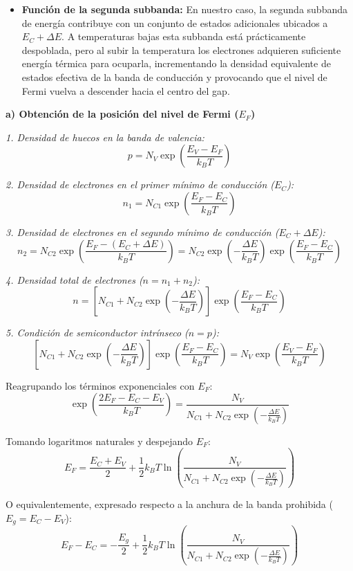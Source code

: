 \begin{problema}
\begin{itemize}
    \item \textbf{Función de la segunda subbanda:}
    En nuestro caso, la segunda subbanda de energía contribuye con un conjunto de estados adicionales ubicados a $E_C + \Delta E$. A temperaturas bajas esta subbanda está prácticamente despoblada, pero al subir la temperatura los electrones adquieren suficiente energía térmica para ocuparla, incrementando la densidad equivalente de estados efectiva de la banda de conducción y provocando que el nivel de Fermi vuelva a descender hacia el centro del gap.
\end{itemize}

\textbf{a) Obtención de la posición del nivel de Fermi ($E_F$)}

\textit{1. Densidad de huecos en la banda de valencia:}
\[
p = N_V \exp\left( \frac{E_V - E_F}{k_B T} \right)
\]

\textit{2. Densidad de electrones en el primer mínimo de conducción ($E_C$):}
\[
n_1 = N_{C1} \exp\left( \frac{E_F - E_C}{k_B T} \right)
\]

\textit{3. Densidad de electrones en el segundo mínimo de conducción ($E_C + \Delta E$):}
\[
n_2 = N_{C2} \exp\left( \frac{E_F - (E_C + \Delta E)}{k_B T} \right) = N_{C2} \exp\left( -\frac{\Delta E}{k_B T} \right) \exp\left( \frac{E_F - E_C}{k_B T} \right)
\]

\textit{4. Densidad total de electrones ($n = n_1 + n_2$):}
\[
n = \left[ N_{C1} + N_{C2} \exp\left( -\frac{\Delta E}{k_B T} \right) \right] \exp\left( \frac{E_F - E_C}{k_B T} \right)
\]

\textit{5. Condición de semiconductor intrínseco ($n = p$):}
\[
\left[ N_{C1} + N_{C2} \exp\left( -\frac{\Delta E}{k_B T} \right) \right] \exp\left( \frac{E_F - E_C}{k_B T} \right) = N_V \exp\left( \frac{E_V - E_F}{k_B T} \right)
\]

Reagrupando los términos exponenciales con $E_F$:
\[
\exp\left( \frac{2 E_F - E_C - E_V}{k_B T} \right) = \frac{N_V}{N_{C1} + N_{C2} \exp\left( -\frac{\Delta E}{k_B T} \right)}
\]

Tomando logaritmos naturales y despejando $E_F$:
\[
E_F = \frac{E_C + E_V}{2} + \frac{1}{2} k_B T \ln\left( \frac{N_V}{N_{C1} + N_{C2} \exp\left( -\frac{\Delta E}{k_B T} \right)} \right)
\]

O equivalentemente, expresado respecto a la anchura de la banda prohibida ($E_g = E_C - E_V$):
\[
E_F - E_C = -\frac{E_g}{2} + \frac{1}{2} k_B T \ln\left( \frac{N_V}{N_{C1} + N_{C2} \exp\left( -\frac{\Delta E}{k_B T} \right)} \right)
\]


\end{problema}
